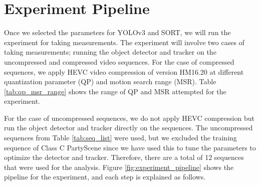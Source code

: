 \section{Experiment Pipeline}
\label{sec:methods/section_c}

Once we selected the parameters for YOLOv3 and SORT, we will run the experiment for taking measurements. The experiment will involve two cases of taking measurements; running the object detector and tracker on the uncompressed and compressed video sequences. For the case of compressed sequences, we apply HEVC video compression of version HM16.20 at different quantization parameter (QP) and motion search range (MSR). Table \ref{tab:qp_msr_range} shows the range of QP and MSR attempted for the experiment.

For the case of uncompressed sequences, we do not apply HEVC compression but run the object detector and tracker directly on the sequences. The uncompressed sequences from Table \ref{tab:seq_list} were used, but we excluded the training sequence of Class C PartyScene since we have used this to tune the parameters to optimize the detector and tracker. Therefore, there are a total of 12 sequences that were used for the analysis. Figure \ref{fig:experiment_pipeline} shows the pipeline for the experiment, and each step is explained as follows.



